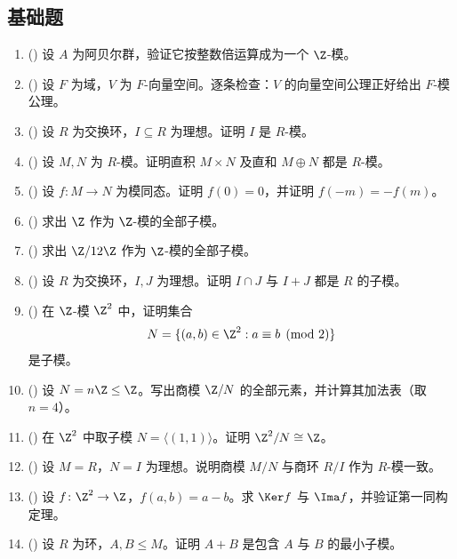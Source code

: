 \subsection*{基础题}

\begin{enumerate}[label=\textbf{10.\arabic*.}, leftmargin=3.2em]
  \item (\basic) 设 $A$ 为阿贝尔群，验证它按整数倍运算成为一个 $\Z$-模。

  \item (\basic) 设 $F$ 为域，$V$ 为 $F$-向量空间。逐条检查：$V$ 的向量空间公理正好给出 $F$-模公理。

  \item (\basic) 设 $R$ 为交换环，$I\subseteq R$ 为理想。证明 $I$ 是 $R$-模。

  \item (\basic) 设 $M,N$ 为 $R$-模。证明直积 $M\times N$ 及直和 $M\oplus N$ 都是 $R$-模。

  \item (\basic) 设 $f\colon M\to N$ 为模同态。证明 $f(0)=0$，并证明 $f(-m)=-f(m)$。

  \item (\basic) 求出 $\Z$ 作为 $\Z$-模的全部子模。

  \item (\basic) 求出 $\Z/12\Z$ 作为 $\Z$-模的全部子模。

  \item (\basic) 设 $R$ 为交换环，$I,J$ 为理想。证明 $I\cap J$ 与 $I+J$ 都是 $R$ 的子模。

  \item (\basic) 在 $\Z$-模 $\Z^2$ 中，证明集合
  \[
  N=\{(a,b)\in \Z^2: a\equiv b\pmod 2\}
  \]
  是子模。

  \item (\basic) 设 $N=n\Z\le \Z$。写出商模 $\Z/N$ 的全部元素，并计算其加法表（取 $n=4$）。

  \item (\basic) 在 $\Z^2$ 中取子模 $N=\langle (1,1)\rangle$。证明 $\Z^2/N\cong \Z$。

  \item (\basic) 设 $M=R$，$N=I$ 为理想。说明商模 $M/N$ 与商环 $R/I$ 作为 $R$-模一致。

  \item (\basic) 设 $f\colon \Z^2\to \Z$，$f(a,b)=a-b$。求 $\Ker f$ 与 $\Ima f$，并验证第一同构定理。

  \item (\basic) 设 $R$ 为环，$A,B\le M$。证明 $A+B$ 是包含 $A$ 与 $B$ 的最小子模。


\end{enumerate}
